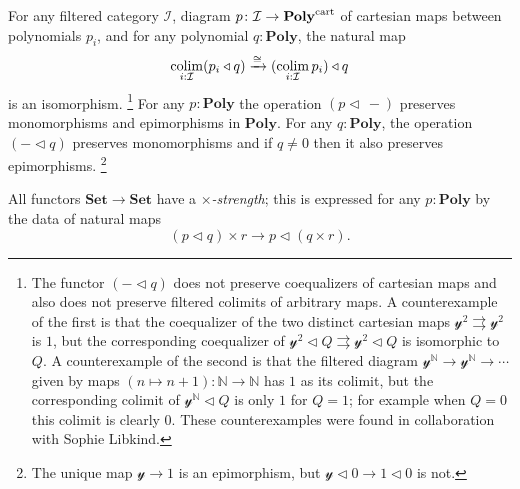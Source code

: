 \documentclass[11pt, one side, article]{memoir}
\theoremstyle{definition}
\theoremstyle{plain}
\DeclareMathOperator*{\colim}{colim}
\newcommand{\cat}[1]{\mathcal{#1}}%
\newcommand{\Cat}[1]{\mathbf{#1}}%
\newcommand{\tto}{\rightrightarrows}
\newcommand{\To}[2][]{\xrightarrow[#1]{\tn{$#2$}}}
\newcommand{\tn}[1]{\textnormal{#1}}
\newcommand{\nn}{\mathbb{N}}
\newcommand{\smset}{\Cat{Set}}
\newcommand{\yon}{{\mathcal{y}}}
\newcommand{\poly}{\Cat{Poly}}
\newcommand{\cart}{\tn{cart}}
\newcommand{\polycart}{\poly^\cart}
\newcommand{\0}{\textsf{0}}
\newcommand{\1}{\tn{\textsf{1}}}
\newcommand{\tri}{\mathbin{\triangleleft}}
\begin{document}
For any filtered category $\cat{I}$, diagram $p\colon \cat{I}\to\polycart$ of cartesian maps between polynomials $p_i$, and for any polynomial $q:\poly$, the natural map
\begin{equation}\label{eqn.cart_tri}
	\colim_{i: \cat{I}}(p_i\tri q)
	\To{\cong}
	(\colim_{i: \cat{I}}p_i)\tri q
\end{equation}
is an isomorphism.%
\footnote{The functor $(-\tri q)$ does not preserve coequalizers of cartesian maps and also does not preserve filtered colimits of arbitrary maps. A counterexample of the first is that the coequalizer of the two distinct cartesian maps $\yon^2\tto\yon^2$ is $1$, but the corresponding coequalizer of $\yon^2\tri Q\tto \yon^2\tri Q$ is isomorphic to $Q$. A counterexample of the second is that the filtered diagram $\yon^\nn\to\yon^\nn\to\cdots$ given by maps $(n\mapsto n+1)\colon\nn\to\nn$ has $1$ as its colimit, but the corresponding colimit of $\yon^\nn\tri Q$ is only $1$ for $Q=1$; for example when $Q=0$ this colimit is clearly $0$. These counterexamples were found in collaboration with Sophie Libkind.
}
 For any $p:\poly$ the operation $(p\tri\,-)$ preserves monomorphisms and epimorphisms in $\poly$. For any $q:\poly$, the operation $(-\tri q)$ preserves monomorphisms and if $q\neq 0$ then it also preserves epimorphisms.%
\footnote{The unique map $\yon\to 1 $ is an epimorphism, but $\yon\tri 0\to 1\tri 0$ is not.}

All functors $\smset\to\smset$ have a \emph{$\times$-strength}; this is expressed for any $p:\poly$ by the data of natural maps
\begin{equation}\label{eqn.strength}
	(p\tri q)\times r\to p\tri(q\times r).
\end{equation}
\end{document}

